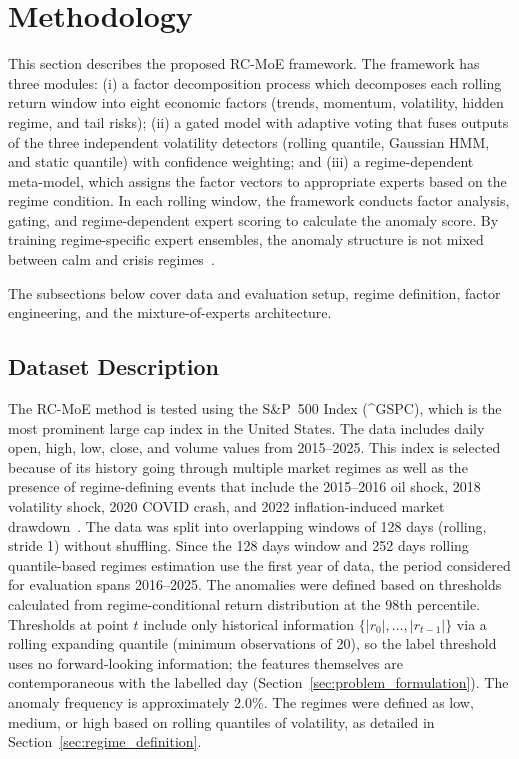 \documentclass[]{interact}
\begin{document}
\section{Methodology}
\label{sec:methodology}
This section describes the proposed RC-MoE framework. The framework has three modules: (i) a factor decomposition process which decomposes each rolling return window into eight economic factors (trends, momentum, volatility, hidden regime, and tail risks); (ii) a gated model with adaptive voting that fuses outputs of the three independent volatility detectors (rolling quantile, Gaussian HMM, and static quantile) with confidence weighting; and (iii) a regime-dependent meta-model, which assigns the factor vectors to appropriate experts based on the regime condition. In each rolling window, the framework conducts factor analysis, gating, and regime-dependent expert scoring to calculate the anomaly score. By training regime-specific expert ensembles, the anomaly structure is not mixed between calm and crisis regimes~\citep{hamilton1989a}.

The subsections below cover data and evaluation setup, regime definition, factor engineering, and the mixture-of-experts architecture.

\subsection{Dataset Description}
The RC-MoE method is tested using the S\&P~500 Index (\^{}GSPC),
which is the most prominent large cap index in the United States.
The data includes daily open, high, low, close, and volume values from
2015--2025. This index is selected because of its history going through
multiple market regimes as well as the presence of regime-defining events
that include the 2015--2016 oil shock, 2018 volatility shock, 2020 COVID
crash, and 2022 inflation-induced market drawdown~\citep{cont2001empirical}. The data was split
into overlapping windows of 128 days (rolling, stride 1) without shuffling. Since the 128
days window and 252 days rolling quantile-based regimes estimation use the
first year of data, the period considered for evaluation spans 2016--2025. The
anomalies were defined based on thresholds calculated from regime-conditional
return distribution at the 98th percentile. Thresholds at point $t$ include only
historical information $\{|r_0|, \ldots, |r_{t-1}|\}$ via a rolling expanding quantile (minimum
observations of 20), so the label threshold uses no forward-looking information; the features themselves are contemporaneous with the labelled day (Section~\ref{sec:problem_formulation}). The anomaly frequency is approximately 2.0\%. The regimes
were defined as low, medium, or high based on rolling quantiles of volatility,
as detailed in Section~\ref{sec:regime_definition}.
\end{document}
